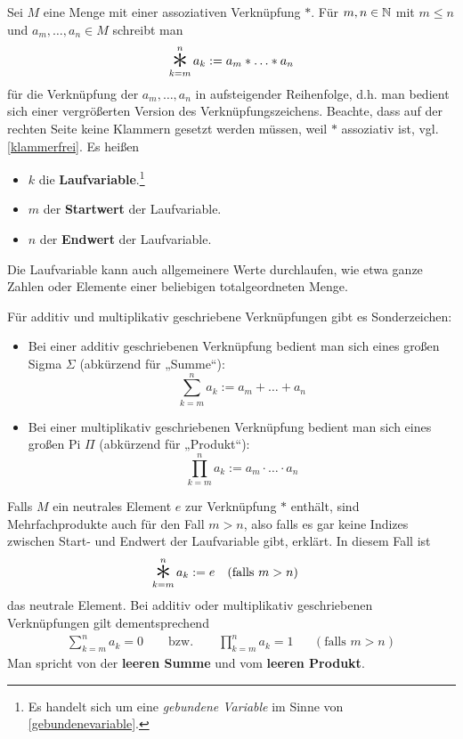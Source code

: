 \begin{nota}[Mehrfachprodukte] \label{mehrfachprodukt}
    Sei $M$ eine Menge mit einer assoziativen Verknüpfung $*$. Für $m,n\in \mathbb N$ mit $m\le n$ und $a_m,\dots , a_n\in M$ schreibt man
        \[ \mathop{\raisebox{-0.6ex}{\scalebox{2.5}{$*$}}}_{k=m}^n a_k := a_m * \ldots * a_n \]
    für die Verknüpfung der $a_m,\dots , a_n$ in aufsteigender Reihenfolge, d.h. man bedient sich einer vergrößerten Version des Verknüpfungszeichens. Beachte, dass auf der rechten Seite keine Klammern gesetzt werden müssen, weil $*$ assoziativ ist, vgl. \cref{klammerfrei}. Es heißen
    \begin{itemize}
        \item $k$ die \textbf{Laufvariable}.\footnote{Es handelt sich um eine \emph{gebundene Variable} im Sinne von \cref{gebundenevariable}.}
        \item $m$ der \textbf{Startwert} der Laufvariable.
        \item $n$ der \textbf{Endwert} der Laufvariable.
    \end{itemize}
    Die Laufvariable kann auch allgemeinere Werte durchlaufen, wie etwa ganze Zahlen oder Elemente einer beliebigen totalgeordneten Menge.
    
    Für additiv und multiplikativ geschriebene Verknüpfungen gibt es Sonderzeichen:
    \begin{itemize}
        \item Bei einer additiv geschriebenen Verknüpfung bedient man sich eines großen Sigma $\Sigma$ (abkürzend für „Summe“):
            \[ \sum_{k=m}^n a_k := a_m + \ldots + a_n \]
        \item Bei einer multiplikativ geschriebenen Verknüpfung bedient man sich eines großen Pi $\Pi$ (abkürzend für „Produkt“):
            \[ \prod_{k=m}^n a_k := a_m \cdot \ldots \cdot a_n \]
    \end{itemize}
    Falls $M$ ein neutrales Element $e$ zur Verknüpfung $*$ enthält, sind Mehrfachprodukte auch für den Fall $m>n$, also falls es gar keine Indizes zwischen Start- und Endwert der Laufvariable gibt, erklärt. In diesem Fall ist
    \begin{align*}
        \mathop{\raisebox{-0.6ex}{\scalebox{2.5}{$*$}}}_{k=m}^n a_k & := e && (\text{falls $m>n$})
    \end{align*}
    das neutrale Element. Bei additiv oder multiplikativ geschriebenen Verknüpfungen gilt dementsprechend
    \begin{align*}
        \sum_{k=m}^n a_k = 0 \qquad\text{bzw.}\qquad \prod_{k=m}^n a_k = 1 && (\text{falls $m>n$})
    \end{align*}
    Man spricht von der \textbf{leeren Summe} und vom \textbf{leeren Produkt}.
    

\end{nota}
